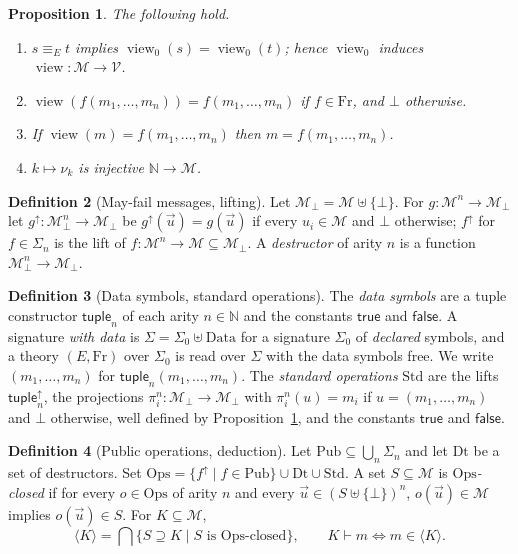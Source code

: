 \documentclass[11pt]{article}
\theoremstyle{definition}
\newtheorem{definition}{Definition}[section]
\theoremstyle{plain}
\newtheorem{proposition}[definition]{Proposition}
\theoremstyle{remark}
\newcommand{\N}{\mathbb{N}}
\newcommand{\Fr}{\mathrm{Fr}}
\newcommand{\view}{\operatorname{view}}
\newcommand{\Ops}{\mathrm{Ops}}
\newcommand{\Pub}{\mathrm{Pub}}
\newcommand{\Dt}{\mathrm{Dt}}
\begin{document}
\begin{proposition}\label{prop:view}
The following hold.
\begin{enumerate}
\item $s\equiv_{E} t$ implies $\view_0(s)=\view_0(t)$; hence $\view_0$ induces $\view:\mathcal{M}\to\mathcal{V}$.
\item $\view(f(m_1,\dots,m_n))=f(m_1,\dots,m_n)$ if $f\in\Fr$, and $\bot$ otherwise.
\item If $\view(m)=f(m_1,\dots,m_n)$ then $m=f(m_1,\dots,m_n)$.
\item $k\mapsto\nu_k$ is injective $\N\to\mathcal{M}$.
\end{enumerate}
\end{proposition}

\begin{definition}[May-fail messages, lifting]
Let $\mathcal{M}_{\bot}=\mathcal{M}\uplus\{\bot\}$. For $g:\mathcal{M}^n\to\mathcal{M}_{\bot}$ let $g^{\uparrow}:\mathcal{M}_{\bot}^n\to\mathcal{M}_{\bot}$ be $g^{\uparrow}(\vec u)=g(\vec u)$ if every $u_i\in\mathcal{M}$ and $\bot$ otherwise; $f^{\uparrow}$ for $f\in\Sigma_n$ is the lift of $f:\mathcal{M}^n\to\mathcal{M}\subseteq\mathcal{M}_{\bot}$. A \emph{destructor} of arity $n$ is a function $\mathcal{M}_{\bot}^n\to\mathcal{M}_{\bot}$.
\end{definition}

\begin{definition}[Data symbols, standard operations]\label{def:data}
The \emph{data symbols} are a tuple constructor $\mathsf{tuple}_n$ of each arity $n\in\N$ and the constants $\mathsf{true}$ and $\mathsf{false}$. A signature \emph{with data} is $\Sigma=\Sigma_0\uplus\mathrm{Data}$ for a signature $\Sigma_0$ of \emph{declared} symbols, and a theory $(E,\Fr)$ over $\Sigma_0$ is read over $\Sigma$ with the data symbols free. We write $(m_1,\dots,m_n)$ for $\mathsf{tuple}_n(m_1,\dots,m_n)$. The \emph{standard operations} $\mathrm{Std}$ are the lifts $\mathsf{tuple}_n^{\uparrow}$, the projections $\pi^n_i:\mathcal{M}_{\bot}\to\mathcal{M}_{\bot}$ with $\pi^n_i(u)=m_i$ if $u=(m_1,\dots,m_n)$ and $\bot$ otherwise, well defined by Proposition~\ref{prop:view}, and the constants $\mathsf{true}$ and $\mathsf{false}$.
\end{definition}

\begin{definition}[Public operations, deduction]
Let $\Pub\subseteq\bigcup_n\Sigma_n$ and let $\Dt$ be a set of destructors. Set $\Ops=\{f^{\uparrow}\mid f\in\Pub\}\cup\Dt\cup\mathrm{Std}$. A set $S\subseteq\mathcal{M}$ is \emph{$\Ops$-closed} if for every $o\in\Ops$ of arity $n$ and every $\vec u\in(S\uplus\{\bot\})^n$, $o(\vec u)\in\mathcal{M}$ implies $o(\vec u)\in S$. For $K\subseteq\mathcal{M}$,
\[
\langle K\rangle=\bigcap\{S\supseteq K\mid S\text{ is $\Ops$-closed}\},
\qquad
K\vdash m\iff m\in\langle K\rangle .
\]
\end{definition}
\end{document}
